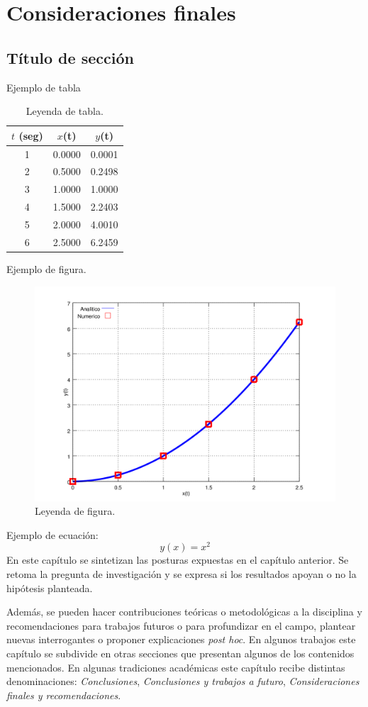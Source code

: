\chapter{Consideraciones finales}

\section{Título de sección}

Ejemplo de tabla

\begin{table}[h!]
	\centering
	\caption{Leyenda de tabla.}
	\label{tab:comp}
	\begin{tabular}{|c|c|c|}
		\hline
		$t$ (seg) & $x$(t) & $y$(t)\\
		\hline
		1 & 0.0000 & 0.0001\\
		2 & 0.5000 & 0.2498\\
		3 & 1.0000 & 1.0000\\
		4 & 1.5000 & 2.2403\\
		5 & 2.0000 & 4.0010\\
		6 & 2.5000 & 6.2459\\
		\hline
	\end{tabular}
\end{table}

Ejemplo de figura.

\begin{figure}[h!]
	\label{fig:comp}
	\includegraphics[width=.8\textwidth]{imagenes/chap4/x_vs_y}
	\caption{Leyenda de figura.}
\end{figure}
Ejemplo de ecuación:
\begin{equation}
y(x)=x^2
\end{equation}
En este capítulo se sintetizan las posturas expuestas en el capítulo anterior. Se retoma la pregunta de investigación y se expresa si los resultados apoyan o no la hipótesis planteada. 

Además, se pueden hacer contribuciones teóricas o metodológicas a la disciplina y recomendaciones para trabajos futuros o para profundizar en el campo, plantear nuevas interrogantes o proponer explicaciones \textit{post hoc}. En algunos trabajos este capítulo se subdivide en otras secciones que presentan algunos de los contenidos mencionados. 
En algunas tradiciones académicas este capítulo recibe distintas denominaciones: \textit{Conclusiones}, \textit{Conclusiones y trabajos a futuro}, \textit{Consideraciones finales y recomendaciones}. 

